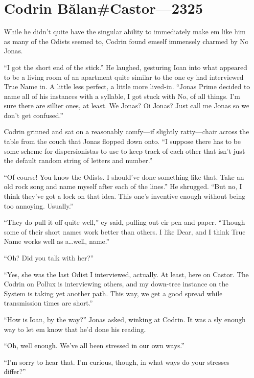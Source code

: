 \hypertarget{codrin-bux103lancastor-2325}{%
\chapter{Codrin Bălan\#Castor—2325}\label{codrin-bux103lancastor-2325}}

While he didn't quite have the singular ability to immediately make em like him as many of the Odists seemed to, Codrin found emself immensely charmed by No Jonas.

``I got the short end of the stick.'' He laughed, gesturing Ioan into what appeared to be a living room of an apartment quite similar to the one ey had interviewed True Name in. A little less perfect, a little more lived-in. ``Jonas Prime decided to name all of his instances with a syllable, I got stuck with No, of all things. I'm sure there are sillier ones, at least. We Jonas? Oi Jonas? Just call me Jonas so we don't get confused.''

Codrin grinned and sat on a reasonably comfy---if slightly ratty---chair across the table from the couch that Jonas flopped down onto. ``I suppose there has to be some scheme for dispersionistas to use to keep track of each other that isn't just the default random string of letters and number.''

``Of course! You know the Odists. I should've done something like that. Take an old rock song and name myself after each of the lines.'' He shrugged. ``But no, I think they've got a lock on that idea. This one's inventive enough without being too annoying. Usually.''

``They do pull it off quite well,'' ey said, pulling out eir pen and paper. ``Though some of their short names work better than others. I like Dear, and I think True Name works well as a\ldots well, name.''

``Oh? Did you talk with her?''

``Yes, she was the last Odist I interviewed, actually. At least, here on Castor. The Codrin on Pollux is interviewing others, and my down-tree instance on the System is taking yet another path. This way, we get a good spread while transmission times are short.''

``How is Ioan, by the way?'' Jonas asked, winking at Codrin. It was a sly enough way to let em know that he'd done his reading.

``Oh, well enough. We've all been stressed in our own ways.''

``I'm sorry to hear that. I'm curious, though, in what ways do your stresses differ?''

